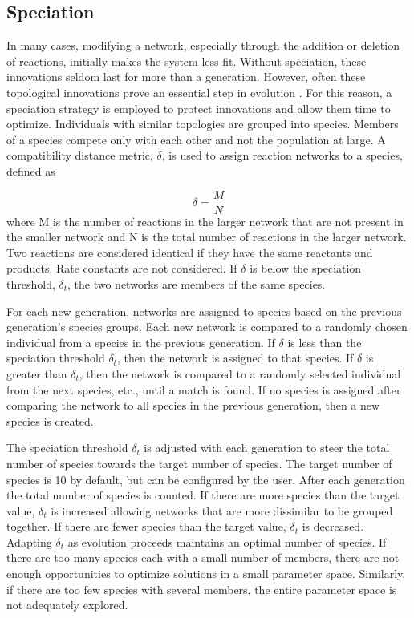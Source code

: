 \documentclass[12pt]{report}
\begin{document}
\subsection{Speciation}
In many cases, modifying a network, especially through the addition or deletion of reactions, initially makes the system less fit. Without speciation, these innovations seldom last for more than a generation. However, often these topological innovations prove an essential step in evolution \cite{stanley_evolving_2002}. For this reason, a speciation strategy is employed to protect innovations and allow them time to optimize. Individuals with similar topologies are grouped into species. Members of a species compete only with each other and not the population at large.  A compatibility distance metric, $\delta$, is used to assign reaction networks to a species, defined as

\begin{equation}
\delta=\frac{M}{N}
\end{equation}
where M is the number of reactions in the larger network that are not present in the smaller network and N is the total number of reactions in the larger network. Two reactions are considered identical if they have the same reactants and products. Rate constants are not considered. If $\delta$ is below the speciation threshold, $\delta_{t}$, the two networks are members of the same species.

For each new generation, networks are assigned to species based on the previous generation's species groups. Each new network is compared to a randomly chosen individual from a species in the previous generation. If $\delta$ is less than the speciation threshold $\delta_{t}$, then the network is assigned to that species. If $\delta$ is greater than $\delta_{t}$, then the network is compared to a randomly selected individual from the next species, etc., until a match is found. If no species is assigned after comparing the network to all species in the previous generation, then a new species is created. 

The speciation threshold $\delta_{t}$ is adjusted with each generation to steer the total number of species towards the target number of species. The target number of species is 10 by default, but can be configured by the user. After each generation the total number of species is counted. If there are more species than the target value, $\delta_{t}$ is increased allowing networks that are more dissimilar to be grouped together. If there are fewer species than the target value, $\delta_{t}$ is decreased. Adapting $\delta_{t}$ as evolution proceeds maintains an optimal number of species. If there are too many species each with a small number of members, there are not enough opportunities to optimize solutions in a small parameter space. Similarly, if there are too few species with several members, the entire parameter space is not adequately explored. 
\end{document}
